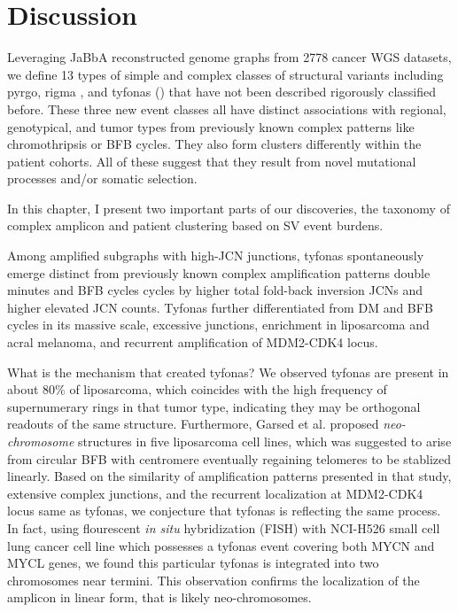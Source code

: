 \documentclass[phd,tocprelim]{cornell}
\begin{document}
\section{Discussion}
Leveraging JaBbA reconstructed genome graphs from 2778 cancer WGS datasets, we define 13 types of simple and complex classes of structural variants including pyrgo, rigma \cite{Hadi2020-um}, and tyfonas () that have not been described rigorously classified before. These three new event classes all have distinct associations with regional, genotypical, and tumor types from previously known complex patterns like chromothripsis or BFB cycles. They also form clusters differently within the patient cohorts. All of these suggest that they result from novel mutational processes and/or somatic selection.

In this chapter, I present two important parts of our discoveries, the taxonomy of complex amplicon and patient clustering based on SV event burdens.

Among amplified subgraphs with high-JCN junctions, tyfonas spontaneously emerge distinct from previously known complex amplification patterns double minutes and BFB cycles cycles by higher total fold-back inversion JCNs and higher elevated JCN counts. Tyfonas further differentiated from DM and BFB cycles in its massive scale, excessive junctions, enrichment in liposarcoma and acral melanoma, and recurrent amplification of MDM2-CDK4 locus.

What is the mechanism that created tyfonas? We observed tyfonas are present in about 80\% of liposarcoma, which coincides with the high frequency of supernumerary rings in that tumor type, indicating they may be orthogonal readouts of the same structure. Furthermore, Garsed et al. \cite{garsed2014} proposed \textit{neo-chromosome} structures in five liposarcoma cell lines, which was suggested to arise from circular BFB with centromere eventually regaining telomeres to be stablized linearly. Based on the similarity of amplification patterns presented in that study, extensive complex junctions, and the recurrent localization at MDM2-CDK4 locus same as tyfonas, we conjecture that tyfonas is reflecting the same process. In fact, using flourescent \textit{in situ} hybridization (FISH) with NCI-H526 small cell lung cancer cell line which possesses a tyfonas event covering both MYCN and MYCL genes, we found this particular tyfonas is integrated into two chromosomes near termini. This observation confirms the localization of the amplicon in linear form, that is likely neo-chromosomes.
\end{document}
